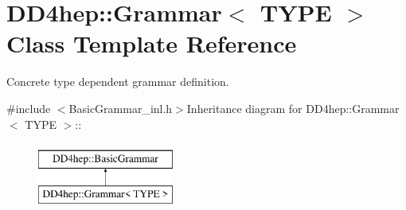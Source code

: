\hypertarget{class_d_d4hep_1_1_grammar}{
\section{DD4hep::Grammar$<$ TYPE $>$ Class Template Reference}
\label{class_d_d4hep_1_1_grammar}
}


Concrete type dependent grammar definition.  


{\ttfamily \#include $<$BasicGrammar\_\-inl.h$>$}Inheritance diagram for DD4hep::Grammar$<$ TYPE $>$::\begin{figure}[H]
\begin{center}
\leavevmode
\includegraphics[height=2cm]{class_d_d4hep_1_1_grammar}
\end{center}
\end{figure}
